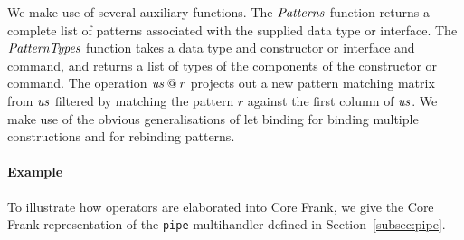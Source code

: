 \documentclass[11pt]{article}
\begin{document}
We make use of several auxiliary functions. The $\mathit{Patterns}$ function
returns a complete list of patterns associated with the supplied data
type or interface. The $\mathit{PatternTypes}$ function takes a data type and
constructor or interface and command, and returns a list of types of
the components of the constructor or command. The operation $\mathit{us} \mathbin{@}
r$ projects out a new pattern matching matrix from $\mathit{us}$ filtered by
matching the pattern $r$ against the first column of $\mathit{us}$. We make
use of the obvious generalisations of let binding for binding multiple
constructions and for rebinding patterns.

\paragraph{Example}
To illustrate how operators are elaborated into Core Frank, we give
the Core Frank representation of the \verb!pipe! multihandler defined
in Section~\ref{subsec:pipe}.
\end{document}
